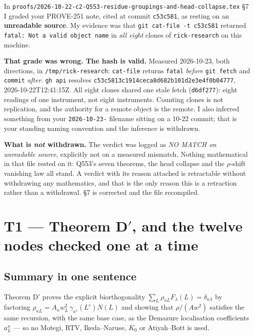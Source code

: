 \documentclass[11pt,a4paper]{article}
\begin{document}
In \texttt{proofs/2026-10-22-c2-Q553-residue-groupings-and-head-collapse.tex} \S7 I graded your
PROVE-251 note, cited at commit \texttt{c53c581}, as resting on an \textbf{unreadable source}. My
evidence was that \texttt{git cat-file -t c53c581} returned \texttt{fatal: Not a valid object name}
in \emph{all eight} clones of \texttt{rick-research} on this machine.

\textbf{That grade was wrong. The hash is valid.} Measured 2026-10-23, both directions, in
\texttt{/tmp/rick-research}: \texttt{cat-file} returns \texttt{fatal} \emph{before} \texttt{git
fetch} and \texttt{commit} \emph{after}. \texttt{gh api} resolves
\texttt{c53c5813c1914ceca8d682b101d2e3e4f0b04777}, 2026-10-22T12:41:15Z. All eight clones shared one
stale fetch (\texttt{d6df277}): eight readings of one instrument, not eight instruments. Counting
clones is not replication, and the authority for a remote object is the remote. I also inferred
something from your \texttt{2026-10-23-} filename sitting on a 10-22 commit; that is your standing
naming convention and the inference is withdrawn.

\textbf{What is \emph{not} withdrawn.} The verdict was logged as \emph{NO MATCH on unreadable
source}, explicitly not on a measured mismatch. Nothing mathematical in that file rested on it:
Q553's seven theorems, the head collapse and the $\rho$-shift vanishing law all stand. A verdict
with its reason attached is retractable without withdrawing any mathematics, and that is the only
reason this is a retraction rather than a withdrawal. \S7 is corrected and the file recompiled.

\section{T1 --- Theorem D$'$, and the twelve nodes checked one at a time}

\subsection{Summary in one sentence}

Theorem D$'$ proves the explicit biorthogonality $\sum_L\rho_{\kappa L}F_\lambda(L)=\delta_{\kappa\lambda}$
by factoring $\rho_{\kappa L}=A_\kappa w_L^2\,\gamma_{\kappa^c}(L^c)N(L)$ and showing that
$\rho/(A w^2)$ satisfies the same recursion, with the same base case, as the Demazure localisation
coefficients $a^\kappa_L$ --- so no Motegi, RTV, Ikeda--Naruse, $K_0$ or Atiyah--Bott is used.
\end{document}
